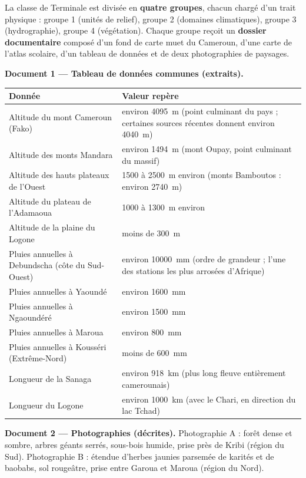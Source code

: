 \documentclass[11pt]{article}
\begin{document}
La classe de Terminale est divisée en \textbf{quatre groupes}, chacun chargé d'un trait physique : groupe 1 (unités de relief), groupe 2 (domaines climatiques), groupe 3 (hydrographie), groupe 4 (végétation). Chaque groupe reçoit un \textbf{dossier documentaire} composé d'un fond de carte muet du Cameroun, d'une carte de l'atlas scolaire, d'un tableau de données et de deux photographies de paysages.

\textbf{Document 1 — Tableau de données communes (extraits).}

\begin{center}
\begin{tabularx}{\linewidth}{|l|X|}
\hline
\rowcolor{popblueL} \textbf{Donnée} & \textbf{Valeur repère} \\
\hline
Altitude du mont Cameroun (Fako) & environ \SI{4095}{m} (point culminant du pays ; certaines sources récentes donnent environ \SI{4040}{m}) \\
\hline
Altitude des monts Mandara & environ \SI{1494}{m} (mont Oupay, point culminant du massif) \\
\hline
Altitude des hauts plateaux de l'Ouest & \num{1500} à \SI{2500}{m} environ (monts Bamboutos : environ \SI{2740}{m}) \\
\hline
Altitude du plateau de l'Adamaoua & \num{1000} à \SI{1300}{m} environ \\
\hline
Altitude de la plaine du Logone & moins de \SI{300}{m} \\
\hline
Pluies annuelles à Debundscha (côte du Sud-Ouest) & environ \SI{10000}{mm} (ordre de grandeur ; l'une des stations les plus arrosées d'Afrique) \\
\hline
Pluies annuelles à Yaoundé & environ \SI{1600}{mm} \\
\hline
Pluies annuelles à Ngaoundéré & environ \SI{1500}{mm} \\
\hline
Pluies annuelles à Maroua & environ \SI{800}{mm} \\
\hline
Pluies annuelles à Kousséri (Extrême-Nord) & moins de \SI{600}{mm} \\
\hline
Longueur de la Sanaga & environ \SI{918}{km} (plus long fleuve entièrement camerounais) \\
\hline
Longueur du Logone & environ \SI{1000}{km} (avec le Chari, en direction du lac Tchad) \\
\hline
\end{tabularx}
\end{center}

\textbf{Document 2 — Photographies (décrites).} Photographie A : forêt dense et sombre, arbres géants serrés, sous-bois humide, prise près de Kribi (région du Sud). Photographie B : étendue d'herbes jaunies parsemée de karités et de baobabs, sol rougeâtre, prise entre Garoua et Maroua (région du Nord).
\end{document}
